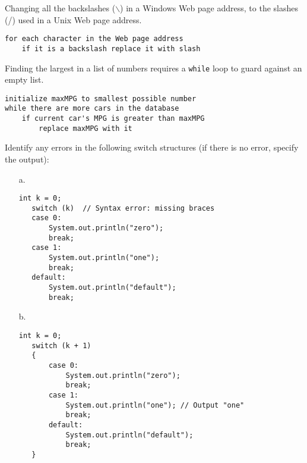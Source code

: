 \begin{ANS}
\begin{ANSBL}
\item  Changing all the backslashes ($\backslash$) in a
Windows Web page address, to the slashes (/) used in
a Unix Web page address.

\begin{jjjlisting}
\begin{lstlisting}[basicstyle=\scriptsize]
for each character in the Web page address
    if it is a backslash replace it with slash
\end{lstlisting}
\end{jjjlisting}


\item  Finding the largest in a list of  numbers
requires a {\tt while} loop to guard against
an empty list.

\begin{jjjlisting}
\begin{lstlisting}[basicstyle=\scriptsize]
initialize maxMPG to smallest possible number
while there are more cars in the database
    if current car's MPG is greater than maxMPG
        replace maxMPG with it
\end{lstlisting}
\end{jjjlisting}


\end{ANSBL}

\item  Identify any errors in the following switch structures (if
there is no error, specify the output):

\begin{enumerate}
\item[a.]

\begin{jjjlisting}
\begin{lstlisting}[basicstyle=\scriptsize]
   int k = 0;
   switch (k)  // Syntax error: missing braces
   case 0:
       System.out.println("zero");
       break;
   case 1:
       System.out.println("one");
       break;
   default:
       System.out.println("default");
       break;
\end{lstlisting}
\end{jjjlisting}

\item[b.]

\begin{jjjlisting}
\begin{lstlisting}[basicstyle=\scriptsize]
   int k = 0;
   switch (k + 1) 
   {   
       case 0:
           System.out.println("zero");
           break;
       case 1:
           System.out.println("one"); // Output "one"
           break;
       default:
           System.out.println("default");
           break;
   }
\end{lstlisting}
\end{jjjlisting}


\end{enumerate}
\end{ANS}
